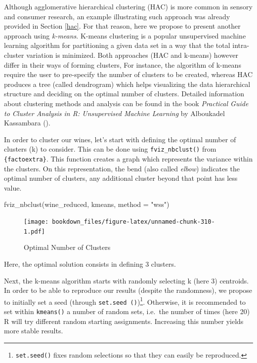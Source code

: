 \documentclass[
]{krantz}
\makeatletter
\newenvironment{Shaded}{\begin{snugshade}}{\end{snugshade}}
\newcommand{\AttributeTok}[1]{\textcolor[rgb]{0.61,0.61,0.61}{#1}}
\newcommand{\FunctionTok}[1]{\textcolor[rgb]{0,0,0}{#1}}
\newcommand{\NormalTok}[1]{#1}
\newcommand{\StringTok}[1]{\textcolor[rgb]{0.5,0.5,0.5}{#1}}
\newenvironment{kframe}{%
\medskip{}
\setlength{\fboxsep}{.8em}
 \def\at@end@of@kframe{}%
 \ifinner\ifhmode%
  \def\at@end@of@kframe{\end{minipage}}%
  \begin{minipage}{\columnwidth}%
 \fi\fi%
 \def\FrameCommand##1{\hskip\@totalleftmargin \hskip-\fboxsep
 \colorbox{shadecolor}{##1}\hskip-\fboxsep
     \hskip-\linewidth \hskip-\@totalleftmargin \hskip\columnwidth}%
 \MakeFramed {\advance\hsize-\width
   \@totalleftmargin\z@ \linewidth\hsize
   \@setminipage}}%
 {\par\unskip\endMakeFramed%
 \at@end@of@kframe}
\renewenvironment{Shaded}{\begin{kframe}}{\end{kframe}}
\makeatother
\begin{document}
Although agglomerative hierarchical clustering (HAC) is more common in sensory and consumer research, an example illustrating such approach was already provided in Section \ref{hac}. For that reason, here we propose to present another approach using \emph{k-means}.
K-means clustering is a popular unsupervised machine learning algorithm for partitioning a given data set in a way that the total intra-cluster variation is minimized. Both approaches (HAC and k-means) however differ in their ways of forming clusters, For instance, the algorithm of k-means require the user to pre-specify the number of clusters to be created, whereas HAC produces a tree (called dendrogram) which helps visualizing the data hierarchical structure and deciding on the optimal number of clusters. Detailed information about clustering methods and analysis can be found in the book \emph{Practical Guide to Cluster Analysis in R: Unsupervised Machine Learning} by Alboukadel Kassambara (\citet{Kassambara2017}).

In order to cluster our wines, let's start with defining the optimal number of clusters (k) to consider. This can be done using \texttt{fviz\_nbclust()} from \texttt{\{factoextra\}}. This function creates a graph which represents the variance within the clusters. On this representation, the bend (also called \emph{elbow}) indicates the optimal number of clusters, any additional cluster beyond that point has less value.

\begin{Shaded}
\begin{Highlighting}[]
\FunctionTok{fviz\_nbclust}\NormalTok{(wine\_reduced, kmeans, }\AttributeTok{method =} \StringTok{"wss"}\NormalTok{)}
\end{Highlighting}
\end{Shaded}

\begin{figure}
\centering
\texttt{[image: bookdown\_files/figure-latex/unnamed-chunk-310-1.pdf]}
\caption{\label{fig:unnamed-chunk-310}Optimal Number of Clusters}
\end{figure}

Here, the optimal solution consists in defining 3 clusters.

Next, the k-means algorithm starts with randomly selecting k (here 3) centroids. In order to be able to reproduce our results (despite the randomness), we propose to initially set a seed (through \texttt{set.seed\ ()})\footnote{\texttt{set.seed()} fixes random selections so that they can easily be reproduced.}. Otherwise, it is recommended to set within \texttt{kmeans()} a number of random sets, i.e.~the number of times (here 20) R will try different random starting assignments. Increasing this number yields more stable results.
\end{document}
